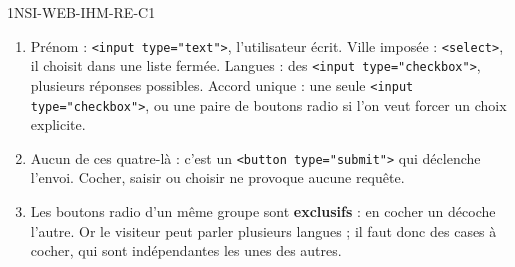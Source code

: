 \begin{corrige}{1NSI-WEB-IHM-RE-C1}
\begin{enumerate}
  \item Prénom : \lstinline{<input type="text">}, l'utilisateur écrit.
        Ville imposée : \lstinline{<select>}, il choisit dans une liste fermée.
        Langues : des \lstinline{<input type="checkbox">}, plusieurs réponses possibles.
        Accord unique : une seule \lstinline{<input type="checkbox">}, ou une paire de boutons
        radio si l'on veut forcer un choix explicite.
  \item Aucun de ces quatre-là : c'est un \lstinline{<button type="submit">} qui déclenche
        l'envoi. Cocher, saisir ou choisir ne provoque aucune requête.
  \item Les boutons radio d'un même groupe sont \textbf{exclusifs} : en cocher un décoche
        l'autre. Or le visiteur peut parler plusieurs langues ; il faut donc des cases à
        cocher, qui sont indépendantes les unes des autres.
\end{enumerate}
\end{corrige}

